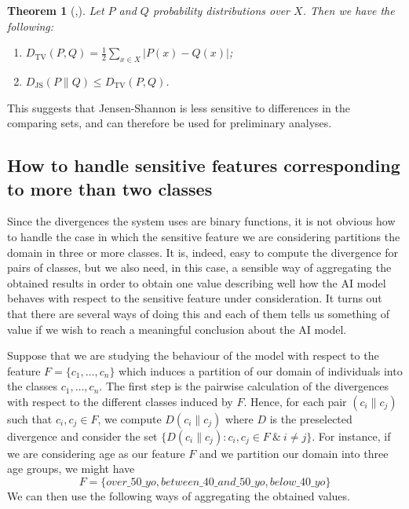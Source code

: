 \documentclass[
]{ceurart}
\newtheorem*{theorem*}{Theorem}
\begin{document}
\begin{theorem*}[{\cite[Prop. 4.2]{levin2017markov}},{\cite[Thm. 3]{lin_divergence}}]
Let $P$ and $Q$ probability distributions over $X$. Then we have the following:
\begin{enumerate}
\item $D_{\mathrm{TV}}(P,Q)=\frac{1}{2}\sum_{x\in X}\vert P(x)-Q(x)\vert$;
\vspace{0.2cm}
\item $D_{\mathrm{JS}}(P\parallel Q)\leq D_\mathrm{TV}(P,Q)$.
\vspace{0.2cm}
\end{enumerate}
\end{theorem*}

This suggests that Jensen-Shannon is less sensitive to differences in the comparing sets, and can therefore be used for preliminary analyses.

\subsection{How to handle sensitive features corresponding to more than two classes}
Since the divergences the system uses are binary functions, it is not obvious how to handle the case in which the sensitive feature we are considering partitions the domain in three or more classes. It is, indeed, easy to compute the divergence for pairs of classes, but we also need, in this case, a sensible way of aggregating the obtained results in order to obtain one value describing well how the AI model behaves with respect to the sensitive feature under consideration. It turns out that there are several ways of doing this and each of them tells us something of value if we wish to reach a meaningful conclusion about the AI model.

Suppose that we are studying the behaviour of the model with respect to the feature $F=\{c_1, \ldots , c_n\}$ which induces a partition of our domain of individuals into the classes $c_1, \ldots , c_n$. The first step is the pairwise calculation of the divergences with respect to the different classes induced by $F$. Hence, for each pair $(c_i\parallel c_j)$ such that $c_i, c_j\in F$, we compute $D(c_i\parallel c_j) $ where $D$ is the  preselected divergence and consider the set $\{D(c_i\parallel c_j) : c_i,c_j\in F\ \&\ i\neq j\}$. For instance, if we are considering age as our feature  $F$ and we partition our domain into three age groups, we might have
\[F=\{over\_50\_yo, between\_40\_and\_50\_yo, below\_40\_yo\}\]
We can then use the following ways of aggregating the obtained values.
\end{document}
